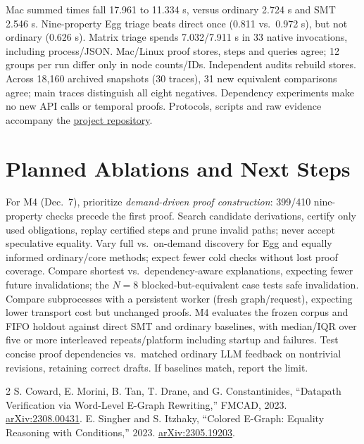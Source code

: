 \documentclass[conference,10pt,letterpaper]{IEEEtran}
\begin{document}
Mac summed times fall 17.961 to 11.334 s, versus ordinary 2.724 s and SMT 2.546 s. Nine-property Egg triage beats direct once (0.811 vs.~0.972 s), but not ordinary (0.626 s). Matrix triage spends 7.032/7.911 s in 33 native invocations, including process/JSON. Mac/Linux proof stores, steps and queries agree; 12 groups per run differ only in node counts/IDs. Independent audits rebuild stores. Across 18,160 archived snapshots (30 traces), 31 new equivalent comparisons agree; main traces distinguish all eight negatives. Dependency experiments make no new API calls or temporal proofs. Protocols, scripts and raw evidence accompany the \href{https://github.com/Yiwen543/COMS6998-final-project}{project repository}.

\section{Planned Ablations and Next Steps}
For M4 (Dec.~7), prioritize \emph{demand-driven proof construction}: 399/410 nine-property checks precede the first proof. Search candidate derivations, certify only used obligations, replay certified steps and prune invalid paths; never accept speculative equality. Vary full vs.~on-demand discovery for Egg and equally informed ordinary/core methods; expect fewer cold checks without lost proof coverage. Compare shortest vs.~dependency-aware explanations, expecting fewer future invalidations; the $N=8$ blocked-but-equivalent case tests safe invalidation. Compare subprocesses with a persistent worker (fresh graph/request), expecting lower transport cost but unchanged proofs. M4 evaluates the frozen corpus and FIFO holdout against direct SMT and ordinary baselines, with median/IQR over five or more interleaved repeats/platform including startup and failures. Test concise proof dependencies vs.~matched ordinary LLM feedback on nontrivial revisions, retaining correct drafts. If baselines match, report the limit.

\begin{thebibliography}{2}
 S. Coward, E. Morini, B. Tan, T. Drane, and G. Constantinides, ``Datapath Verification via Word-Level E-Graph Rewriting,'' FMCAD, 2023. \href{https://arxiv.org/abs/2308.00431}{arXiv:2308.00431}.
 E. Singher and S. Itzhaky, ``Colored E-Graph: Equality Reasoning with Conditions,'' 2023. \href{https://arxiv.org/abs/2305.19203}{arXiv:2305.19203}.
\end{thebibliography}
\end{document}
